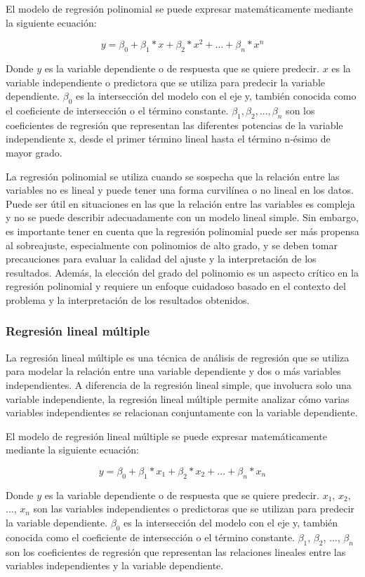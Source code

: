 El modelo de regresión polinomial se puede expresar matemáticamente mediante la siguiente ecuación:

$$y = \beta_{0} + \beta_{1} * x + \beta_{2} * x^2 + ... + \beta_{n} * x^n$$

Donde $y$ es la variable dependiente o de respuesta que se quiere predecir. $x$ es la variable independiente o predictora que se utiliza para predecir la variable dependiente. $\beta_{0}$ es la intersección del modelo con el eje y, también conocida como el coeficiente de intersección o el término constante. $\beta_{1}, \beta_{2}, ..., \beta_{n}$ son los coeficientes de regresión que representan las diferentes potencias de la variable independiente x, desde el primer término lineal hasta el término n-ésimo de mayor grado.

La regresión polinomial se utiliza cuando se sospecha que la relación entre las variables no es lineal y puede tener una forma curvilínea o no lineal en los datos. Puede ser útil en situaciones en las que la relación entre las variables es compleja y no se puede describir adecuadamente con un modelo lineal simple. Sin embargo, es importante tener en cuenta que la regresión polinomial puede ser más propensa al sobreajuste, especialmente con polinomios de alto grado, y se deben tomar precauciones para evaluar la calidad del ajuste y la interpretación de los resultados. Además, la elección del grado del polinomio es un aspecto crítico en la regresión polinomial y requiere un enfoque cuidadoso basado en el contexto del problema y la interpretación de los resultados obtenidos.


\subsubsection{Regresión lineal múltiple}
La regresión lineal múltiple es una técnica de análisis de regresión que se utiliza para modelar la relación entre una variable dependiente y dos o más variables independientes. A diferencia de la regresión lineal simple, que involucra solo una variable independiente, la regresión lineal múltiple permite analizar cómo varias variables independientes se relacionan conjuntamente con la variable dependiente.

El modelo de regresión lineal múltiple se puede expresar matemáticamente mediante la siguiente ecuación:

$$y = \beta_{0} + \beta_{1} * x_{1} + \beta_{2} * x_{2} + ... + \beta_{n} * x_{n}$$

Donde $y$ es la variable dependiente o de respuesta que se quiere predecir. $x_1$, $x_2$, ..., $x_n$ son las variables independientes o predictoras que se utilizan para predecir la variable dependiente. $\beta_0$ es la intersección del modelo con el eje y, también conocida como el coeficiente de intersección o el término constante. $\beta_1$, $\beta_2$, ..., $\beta_n$ son los coeficientes de regresión que representan las relaciones lineales entre las variables independientes y la variable dependiente.

